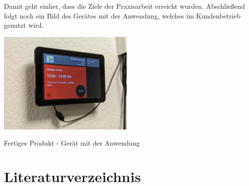 Damit geht einher, dass die Ziele der Praxisarbeit erreicht wurden.
\pagebreak
\newline
Abschließend folgt noch ein Bild des Gerätes mit der Anwendung, welches im Kundenbetrieb genutzt wird.
\newline
\par\vspace{1cm}
    \centering
    \includegraphics[width=0.5\textwidth]{Bilder/FertigesProdukt}
    \caption{Fertiges Produkt - Gerät mit der Anwendung}
    \label{fig:fertiges-produkt}
\newline
\newline
\raggedright
\newpage
\section{Literaturverzeichnis}\label{sec:literaturverzeichnis}